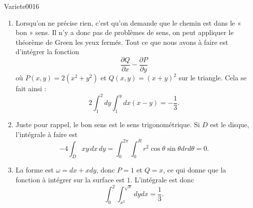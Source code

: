 
\begin{corrige}{Variete0016}

	\begin{enumerate}

		\item
			Lorsqu'on ne précise rien, c'est qu'on demande que le chemin est dans le « bon » sens. Il n'y a donc pas de problèmes de sens, on peut appliquer le théorème de Green les yeux fermés. Tout ce que nous avons à faire est d'intégrer la fonction
			\begin{equation}
				\frac{ \partial Q }{ \partial x }-\frac{ \partial P }{ \partial y }
			\end{equation}
			où $P(x,y)=2(x^2+y^2)$ et $Q(x,y)=(x+y)^2$ sur le triangle. Cela se fait ainsi :
			\begin{equation}
				2\int_1^2dy\int_1^ydx(x-y)=-\frac{ 1 }{ 3 }.
			\end{equation}
			
		\item
			Juste pour rappel, le bon sens est le sens trigonométrique. Si $D$ est le disque, l'intégrale à faire est
			\begin{equation}
				-4\int_Dxy\,dx\,dy=\int_0^{2\pi}\int_0^R r^2\cos\theta\sin\theta drd\theta=0.
			\end{equation}
			
		\item
			La forme est $\omega=dx+xdy$, donc $P=1$ et $Q=x$, ce qui donne que la fonction à intégrer sur la surface est $1$. 
			L'intégrale est donc
			\begin{equation}
				\int_0^2\int_{x^2}^{\sqrt{x}}dydx=\frac{1}{ 3 }.
			\end{equation}


\end{enumerate}
\end{corrige}
